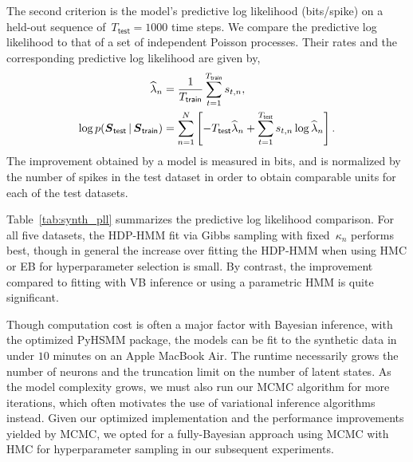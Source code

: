The second criterion is the model's predictive log likelihood
(bits/spike) on a held-out sequence of~${T_{\mathsf{test}}=1000}$ time
steps. We compare the predictive log likelihood to that of a set of
independent Poisson processes. Their rates and the corresponding
predictive log likelihood are given by,
\begin{align*}
\widehat{\lambda}_n 
  &=\frac{1}{T_{\mathsf{train}}}\sum_{t=1}^{T_{\mathsf{train}}} s_{t,n}, \\
  \log p(\boldsymbol{S}_{\mathsf{test}} \,|\, \boldsymbol{S}_{\mathsf{train}}) &= \sum_{n=1}^N \left[ -T_{\mathsf{test}} \widehat{\lambda}_n + \sum_{t=1}^{T_{\mathsf{test}}} s_{t,n} \log \widehat{\lambda}_n  \right].
\end{align*}
The improvement obtained by a model is measured in bits, and is
normalized by the number of spikes in the test dataset in order to
obtain comparable units for each of the test datasets.

Table~\ref{tab:synth_pll} summarizes the predictive log likelihood
comparison.  For all five datasets, the HDP-HMM fit via Gibbs sampling
with fixed~$\kappa_n$ performs best, though in general the increase
over fitting the HDP-HMM when using HMC or EB for hyperparameter
selection is small. By contrast, the improvement compared to fitting
with VB inference or using a parametric HMM is quite significant.

Though computation cost is often a major factor with Bayesian
inference, with the optimized PyHSMM package, the models can be fit to
the synthetic data in under $10$ minutes on an Apple MacBook Air. The
runtime necessarily grows the number of neurons and the truncation
limit on the number of latent states. As the model complexity grows,
we must also run our MCMC algorithm for more iterations, which often
motivates the use of variational inference algorithms instead. Given
our optimized implementation and the performance improvements yielded
by MCMC, we opted for a fully-Bayesian approach using MCMC with HMC
for hyperparameter sampling in our subsequent experiments.

